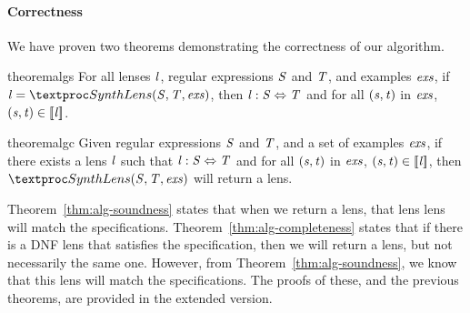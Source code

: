 \documentclass[acmsmall]{acmart}
\begin{document}


\paragraph*{Correctness}
We have proven two theorems demonstrating the correctness of our algorithm.

\begin{restatable}{theorem}{algs}
  \label{thm:alg-soundness}
  For all lenses $\mathit{l}$, regular expressions $\mathit{S}$ and $\mathit{T}$, and
  examples $\mathit{exs}$, 
  if $\Lens = \SynthLens(\Regex,\RegexAlt,\Examples)$, then
  $\mathit{l} : \mathit{S} \Leftrightarrow \mathit{T}$ and for all
  $(\mathit{s},\mathit{t})$ in $\mathit{exs}$, $(\mathit{s},\mathit{t}) \in
  [ \! [\mathit{l}] \! ]$.
\end{restatable}

\begin{restatable}{theorem}{algc}
  \label{thm:alg-completeness}
  Given regular expressions $\mathit{S}$ and $\mathit{T}$, and a set
  of examples $\mathit{exs}$, if there exists a lens $\mathit{l}$ such that
  $\mathit{l} : \mathit{S} \Leftrightarrow \mathit{T}$ and for all
  $(\mathit{s},\mathit{t})$ in $\mathit{exs}$, $(\mathit{s},\mathit{t}) \in
  [ \! [\mathit{l}] \! ]$, then $\SynthLens(\Regex,\RegexAlt,\Examples)$ will
  return a lens.
\end{restatable}

Theorem~\ref{thm:alg-soundness} states that when we return a lens, that lens
lens will match the specifications.  Theorem~\ref{thm:alg-completeness} states
that if there is a DNF lens that satisfies the specification, then we will
return a lens, but not necessarily the same one.  However, from
Theorem~\ref{thm:alg-soundness}, we know that this lens will match the
specifications.  The proofs of these, and the previous theorems, are provided in
the extended version.
\end{document}
